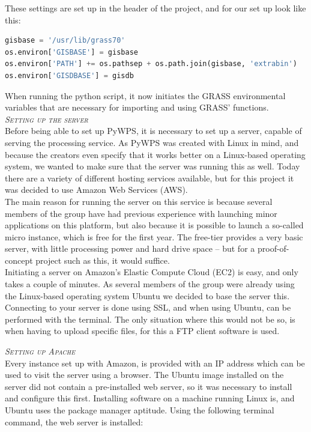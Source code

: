 These settings are set up in the header of the project, and for our set up look like this:

\begin{lstlisting}[language=Python]
gisbase = '/usr/lib/grass70'
os.environ['GISBASE'] = gisbase
os.environ['PATH'] += os.pathsep + os.path.join(gisbase, 'extrabin')
os.environ['GISDBASE'] = gisdb
\end{lstlisting}

When running the python script, it now initiates the GRASS environmental variables that are necessary for importing and using GRASS' functions.\\

\textsc{\textit{Setting up the server}} \\

Before being able to set up PyWPS, it is necessary to set up a server, capable of serving the processing service.  
As PyWPS was created with Linux in mind, and because the creators even specify that it works better on a Linux-based operating system, we wanted to make sure that the server was running this as well. Today there are a variety of different hosting services available, but for this project it was decided to use Amazon Web Services (AWS).\\

The main reason for running the server on this service is because several members of the group have had previous experience with launching minor applications on this platform, but also because it is possible to launch a so-called micro instance, which is free for the first year. The free-tier provides a very basic server, with little processing power and hard drive space – but for a proof-of-concept project such as this, it would suffice. \\
Initiating a server on Amazon's Elastic Compute Cloud (EC2) is easy, and only takes a couple of minutes. As several members of the group were already using the Linux-based operating system Ubuntu we decided to base the server this.\\
Connecting to your server is done using SSL, and when using Ubuntu, can be performed with the terminal. The only situation where this would not be so, is when having to upload specific files, for this a FTP client software is used.

\textsc{\textit{Setting up Apache}}\\

Every instance set up with Amazon, is provided with an IP address which can be used to visit the server using a browser. The Ubuntu image installed on the server did not contain a pre-installed web server, so it was necessary to install and configure this first.
Installing software on a machine running Linux is, and Ubuntu uses the package manager aptitude. Using the following terminal command, the web server is installed:

